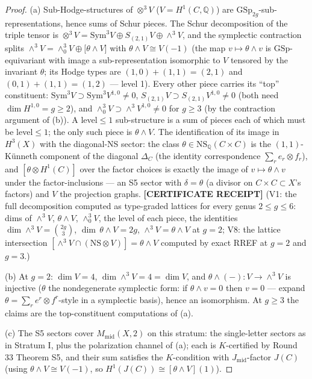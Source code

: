 \documentclass[11pt]{article}
\newcommand{\CERT}{\textbf{[CERTIFICATE RECEIPT]}}
\newcommand{\Q}{\mathbb{Q}}
\newcommand{\GSp}{\mathrm{GSp}}
\newcommand{\NS}{\mathrm{NS}}
\begin{document}
\begin{proof}
(a) Sub-Hodge-structures of $\otimes^3V$ ($V=H^1(C,\Q)$) are
$\GSp_{2g}$-sub-representations, hence sums of Schur pieces. The Schur
decomposition of the triple tensor is
$\otimes^3V=\mathrm{Sym}^3V\oplus S_{(2,1)}V\oplus\wedge^3V$, and the
symplectic contraction splits
$\wedge^3V=\wedge^3_0V\oplus\bigl[\theta\wedge V\bigr]$ with
$\theta\wedge V\cong V(-1)$ (the map $v\mapsto\theta\wedge v$ is
$\GSp$-equivariant with image a sub-representation isomorphic to
$V$ tensored by the invariant $\theta$; its Hodge types are
$(1,0)+(1,1)=(2,1)$ and $(0,1)+(1,1)=(1,2)$ --- level 1). Every other
piece carries its ``top'' constituent: $\mathrm{Sym}^3V\supset
\mathrm{Sym}^3V^{1,0}\ne0$, $S_{(2,1)}V\supset S_{(2,1)}V^{1,0}\ne0$
(both need $\dim H^{1,0}=g\ge2$), and $\wedge^3_0V\supset
\wedge^3V^{1,0}\ne0$ for $g\ge3$ (by the contraction argument of (b)).
A level${}\le1$ sub-structure is a sum of pieces each of which must be
level${}\le1$; the only such piece is $\theta\wedge V$. The
identification of its image in $H^3(X)$ with the diagonal-NS sector:
the class $\theta\in\NS_\Q(C\times C)$ is the $(1,1)$-K\"unneth
component of the diagonal $\Delta_C$ (the identity correspondence
$\sum_r e_r\otimes f_r$), and
$[\theta\otimes H^1(C)]$ over the factor choices is exactly the image of
$v\mapsto\theta\wedge v$ under the factor-inclusions --- an S5 sector
with $\delta=\theta$ (a divisor on $C\times C\subset X$'s factors) and
$V$ the projection graphs.
\CERT{} (V1: the full decomposition computed as type-graded lattices for
every genus $2\le g\le6$: dims of $\wedge^3V$, $\theta\wedge V$,
$\wedge^3_0V$, the level of each piece, the identities
$\dim\wedge^3V=\binom{2g}{3}$, $\dim\,\theta\wedge V=2g$,
$\wedge^3V=\theta\wedge V$ at $g=2$; V8: the lattice intersection
$[\wedge^3V\cap(\NS\otimes V)]=\theta\wedge V$ computed by exact RREF at
$g=2$ and $g=3$.)

(b) At $g=2$: $\dim V=4$, $\dim\wedge^3V=4=\dim V$, and
$\theta\wedge(-)\colon V\to\wedge^3V$ is injective ($\theta$ the
nondegenerate symplectic form: if $\theta\wedge v=0$ then $v=0$ ---
expand $\theta=\sum_r e^r\otimes f^r$-style in a symplectic basis), hence
an isomorphism. At $g\ge3$ the claims are the top-constituent
computations of (a).

(c) The S5 sectors cover $M_{\mathrm{mid}}(X,2)$ on this stratum: the
single-letter sectors as in Stratum I, plus the polarization channel of
(a); each is $K$-certified by Round 33 Theorem S5, and their sum
satisfies the $K$-condition with $J_{\mathrm{mid}}$-factor $J(C)$
(using $\theta\wedge V\cong V(-1)$, so
$H^1(J(C))\cong[\theta\wedge V](1)$).
\end{proof}
\end{document}
